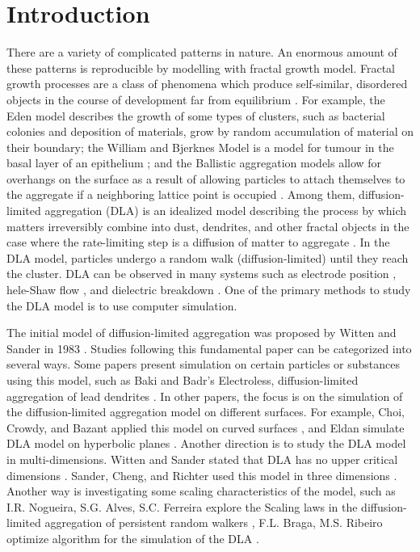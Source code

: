\documentclass[aps,preprint,groupedaddress,letterpaper]{revtex4-1}
\begin{document}
\section{Introduction}
There are a variety of complicated patterns in nature. An enormous amount of these patterns is reproducible by modelling with fractal growth model. Fractal growth processes are a class of phenomena which produce self‐similar, disordered objects in the course of development far from equilibrium \cite{Sander2011}. For example, 
the Eden model describes the growth of some types of clusters, such as bacterial colonies and deposition of materials, grow by random accumulation of material on their boundary; 
the William and Bjerknes Model is a model for tumour in the basal layer of an epithelium \cite{WILLIAMS1972}; 
and the Ballistic aggregation models allow for overhangs on the surface as a result of allowing particles to attach themselves to the aggregate if a neighboring lattice point is occupied \cite{Pelliccione2008}.
Among them, diffusion-limited aggregation (DLA) is an idealized model describing the process by which matters irreversibly combine into dust, dendrites, and other fractal objects in the case where the rate-limiting step is a diffusion of matter to aggregate \cite{PhysRevB.27.5686}. In the DLA model, particles undergo a random walk (diffusion-limited) until they reach the cluster. DLA can be observed in many systems such as electrode position \cite{PhysRevLett.61.2558}, hele-Shaw flow \cite{PhysRevA.33.2663}, and dielectric breakdown \cite{doi:10.1143/JPSJ.55.2479}. One of the primary methods to study the DLA model is to use computer simulation.
 
The initial model of diffusion-limited aggregation was proposed by Witten and Sander in 1983 \cite{PhysRevB.27.5686}. Studies following this fundamental paper can be categorized into several ways. Some papers present simulation on certain particles or substances using this model, such as Baki and Badr’s Electroless, diffusion-limited aggregation of lead dendrites \cite{BAKI2021110586}. In other papers, the focus is on the simulation of the diffusion-limited aggregation model on different surfaces. For example, Choi, Crowdy, and Bazant applied this model on curved surfaces \cite{Choi}, and Eldan simulate DLA model on hyperbolic planes \cite{Eldan}. Another direction is to study the DLA model in multi-dimensions. Witten and Sander stated that DLA has no upper critical dimensions \cite{PhysRevB.27.5686}. Sander, Cheng, and Richter used this model in three dimensions \cite{dla3d}. Another way is investigating some scaling characteristics of the model, such as I.R. Nogueira, S.G. Alves, S.C. Ferreira explore the Scaling laws in the diffusion-limited aggregation of persistent random walkers \cite{scalelaw}, F.L. Braga, M.S. Ribeiro optimize algorithm for the simulation of the DLA \cite{2011CoPhC.182.1602B}.
\end{document}
